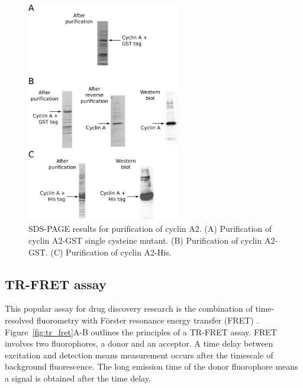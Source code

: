 \begin{figure}
\centering

\includegraphics[width=0.6\textwidth]{figures/purification/purification}

\caption[SDS-PAGE results for purification of cyclin A2]
{SDS-PAGE results for purification of cyclin A2.
(A) Purification of cyclin A2-GST single cysteine mutant.
(B) Purification of cyclin A2-GST.
(C) Purification of cyclin A2-His.}

\label{fig:purification}
\end{figure}


\subsection{TR-FRET assay}

This popular assay for drug discovery research is the combination of time-resolved fluorometry with F\"{o}rster resonance energy transfer (FRET) \cite{Comley2006}.
Figure~\ref{fig:tr_fret}A-B outlines the principles of a TR-FRET assay.
FRET involves two fluorophores, a donor and an acceptor.
A time delay between excitation and detection means measurement occurs after the timescale of background fluorescence.
The long emission time of the donor fluorophore means a signal is obtained after the time delay.

